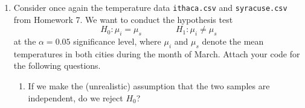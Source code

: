 \documentclass{article}    %
\newcommand{\answer}[1]{{\color{blue}#1}}
\newcommand{\grade}[1]{\textcolor{red}{#1}}
\begin{document}
\begin{enumerate}[leftmargin=0.55cm]
		
		
		
		
		
		
		
		
		
		
		
		
		
		
		\item Consider once again the temperature data \texttt{ithaca.csv} and \texttt{syracuse.csv} from Homework 7. We want to conduct the hypothesis test
		$$
		H_0: \mu_i = \mu_s \qquad \qquad H_1: \mu_i \neq \mu_s
		$$
		at the $\alpha = 0.05$ significance level, where $ \mu_i $ and $ \mu_s $ denote the mean temperatures in both cities during the month of March. Attach your code for the following questions.
		\begin{enumerate}
			\item If we make the (unrealistic) assumption that the two samples are independent, do we reject $H_0$?
			

\end{enumerate}
\end{enumerate}
\end{document}
